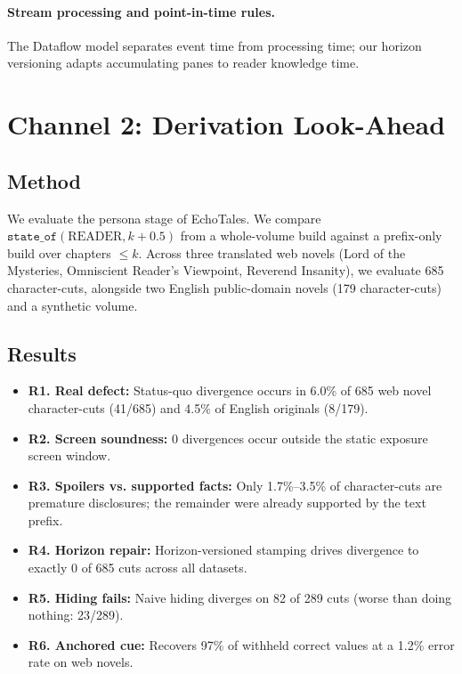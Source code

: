 \documentclass[11pt]{article}
\begin{document}
\paragraph{Stream processing and point-in-time rules.} The Dataflow model \citep{dataflow2015} separates event time from processing time; our horizon versioning adapts accumulating panes to reader knowledge time.

\section{Channel 2: Derivation Look-Ahead}

\subsection{Method}
We evaluate the persona stage of EchoTales. We compare $\texttt{state\_of}(\text{READER}, k+0.5)$ from a whole-volume build against a prefix-only build over chapters $\le k$. Across three translated web novels (Lord of the Mysteries, Omniscient Reader's Viewpoint, Reverend Insanity), we evaluate 685 character-cuts, alongside two English public-domain novels (179 character-cuts) and a synthetic volume.

\subsection{Results}
\begin{itemize}
    \item \textbf{R1. Real defect:} Status-quo divergence occurs in 6.0\% of 685 web novel character-cuts (41/685) and 4.5\% of English originals (8/179).
    \item \textbf{R2. Screen soundness:} 0 divergences occur outside the static exposure screen window.
    \item \textbf{R3. Spoilers vs. supported facts:} Only 1.7\%--3.5\% of character-cuts are premature disclosures; the remainder were already supported by the text prefix.
    \item \textbf{R4. Horizon repair:} Horizon-versioned stamping drives divergence to exactly 0 of 685 cuts across all datasets.
    \item \textbf{R5. Hiding fails:} Naive hiding diverges on 82 of 289 cuts (worse than doing nothing: 23/289).
    \item \textbf{R6. Anchored cue:} Recovers 97\% of withheld correct values at a 1.2\% error rate on web novels.
\end{itemize}
\end{document}
